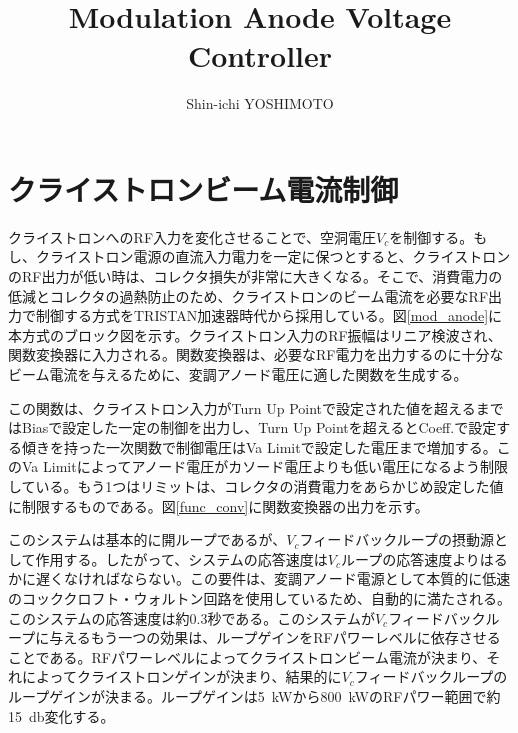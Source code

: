 \documentclass[article]{jlreq}
\begin{document}
\title{Modulation Anode Voltage Controller}
\author{Shin-ichi YOSHIMOTO}
\maketitle


\section{クライストロンビーム電流制御}

クライストロンへのRF入力を変化させることで、空洞電圧$V_c$を制御する。もし、クライストロン電源の直流入力電力を一定に保つとすると、クライストロンのRF出力が低い時は、コレクタ損失が非常に大きくなる。そこで、消費電力の低減とコレクタの過熱防止のため、クライストロンのビーム電流を必要なRF出力で制御する方式をTRISTAN加速器時代から採用している。図\ref{mod_anode}に本方式のブロック図を示す。クライストロン入力のRF振幅はリニア検波され、関数変換器に入力される。関数変換器は、必要なRF電力を出力するのに十分なビーム電流を与えるために、変調アノード電圧に適した関数を生成する。

この関数は、クライストロン入力がTurn Up Pointで設定された値を超えるまではBiasで設定した一定の制御を出力し、Turn Up Pointを超えるとCoeff.で設定する傾きを持った一次関数で制御電圧はVa Limitで設定した電圧まで増加する。このVa Limitによってアノード電圧がカソード電圧よりも低い電圧になるよう制限している。もう1つはリミットは、コレクタの消費電力をあらかじめ設定した値に制限するものである。図\ref{func_conv}に関数変換器の出力を示す。

このシステムは基本的に開ループであるが、$V_c$フィードバックループの摂動源として作用する。したがって、システムの応答速度は$V_c$ループの応答速度よりはるかに遅くなければならない。この要件は、変調アノード電源として本質的に低速のコッククロフト・ウォルトン回路を使用しているため、自動的に満たされる。このシステムの応答速度は約0.3秒である。このシステムが$V_c$フィードバックループに与えるもう一つの効果は、ループゲインをRFパワーレベルに依存させることである。RFパワーレベルによってクライストロンビーム電流が決まり、それによってクライストロンゲインが決まり、結果的に$V_c$フィードバックループのループゲインが決まる。ループゲインは\qty{5}{\kilo\watt}から\qty{800}{\kilo\watt}のRFパワー範囲で約\qty{15}{\decibel}変化する。
\end{document}
